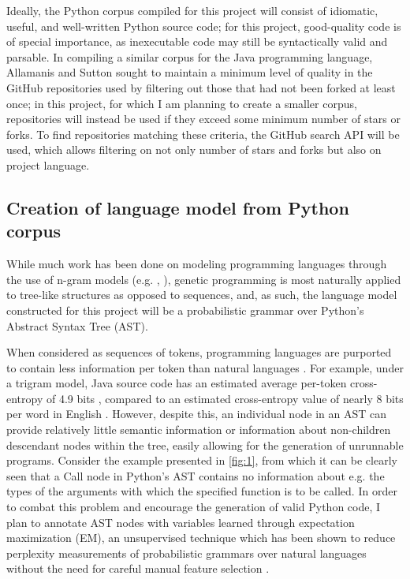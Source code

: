 \documentclass[a4paper,11pt]{proposal}
\begin{document}
Ideally, the Python corpus compiled for this project will consist of idiomatic, useful, and well-written Python source code; for this project, good-quality code is of special importance, as inexecutable code may still be syntactically valid and parsable. In compiling a similar corpus for the Java programming language, Allamanis and Sutton \cite{allamanis2013} sought to maintain a minimum level of quality in the GitHub repositories used by filtering out those that had not been forked at least once; in this project, for which I am planning to create a smaller corpus, repositories will instead be used if they exceed some minimum number of stars or forks. To find repositories matching these criteria, the GitHub search API will be used, which allows filtering on not only number of stars and forks but also on project language.

\subsection{Creation of language model from Python corpus}

While much work has been done on modeling programming languages through the use of n-gram models (e.g. \cite{hindle2012}, \cite{allamanis2013}), genetic programming is most naturally applied to tree-like structures as opposed to sequences, and, as such, the language model constructed for this project will be a probabilistic grammar over Python's Abstract Syntax Tree (AST).

When considered as sequences of tokens, programming languages are purported to contain less information per token than natural languages \cite{hindle2012}. For example, under a trigram model, Java source code has an estimated average per-token cross-entropy of 4.9 bits \cite{allamanis2013}, compared to an estimated cross-entropy value of nearly 8 bits per word in English \cite{brown1992}. However, despite this,  an individual node in an AST can provide relatively little semantic information or information about non-children descendant nodes within the tree, easily allowing for the generation of unrunnable programs. Consider the example presented in \autoref{fig:1}, from which it can be clearly seen that a Call node in Python's AST contains no information about e.g. the types of the arguments with which the specified function is to be called. In order to combat this problem and encourage the generation of valid Python code, I plan to annotate AST nodes with variables learned through expectation maximization (EM), an unsupervised technique which has been shown to reduce perplexity measurements of probabilistic grammars over natural languages without the need for careful manual feature selection \cite{matsuzaki2005} \cite{petrov2006}.
\end{document}
